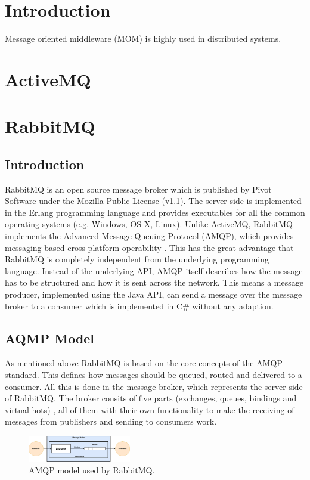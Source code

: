 \section{Introduction}
Message oriented middleware (MOM) is highly used in distributed systems.


\section{ActiveMQ}

\section{RabbitMQ}
\subsection{Introduction}
RabbitMQ \cite{pivotal:main} is an open source message broker which is published by Pivot Software under the Mozilla Public License (v1.1). The server side is implemented in the Erlang programming language and provides executables for all the common operating systems (e.g. Windows, OS X, Linux). Unlike ActiveMQ, RabbitMQ implements the Advanced Message Queuing Protocol (AMQP), which provides messaging-based cross-platform operability \cite{Richards2011}. This has the great advantage that RabbitMQ is completely independent from the underlying programming language. Instead of the underlying API, AMQP itself describes how the message has to be structured and how it is sent across the network. This means a message producer, implemented using the Java API, can send a message over the message broker to a consumer which is implemented in C\# without any adaption.

\subsection{AQMP Model}
As mentioned above RabbitMQ is based on the core concepts of the AMQP standard. This defines how messages should be queued, routed and delivered to a consumer. All this is done in the message broker, which represents the server side of RabbitMQ. The broker consits of five parts (exchanges, queues, bindings and virtual hots) \cite{pivotal:concept, Toshev2015}, all of them with their own functionality to make the receiving of messages from publishers and sending to consumers work. 
\begin{figure}[ht]
\includegraphics[width=0.4\textwidth]{AQMP_1}
\caption{AMQP model used by RabbitMQ.}
\label{fig:model}
\end{figure}

